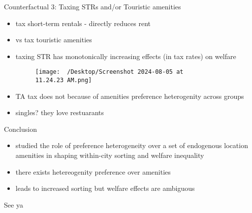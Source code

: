 \begin{frame}{Counterfactual 3: Taxing STRs and/or Touristic amenities}
	\begin{itemize}
		\item tax short-term rentals - directly reduces rent 
        \item vs tax touristic amenities
        \item taxing STR has monotonically increasing effects (in tax rates) on welfare 
        \begin{figure}
            \centering
            \texttt{[image: ~/Desktop/Screenshot 2024-08-05 at 11.24.23 AM.png]}
            \caption{}
            \label{fig:photo}
        \end{figure}
        \item TA tax does not because of amenities preference heterogenity across groups
        \item singles? they love restuarants
	\end{itemize}
\end{frame}

\begin{frame}{Conclusion}
	\begin{itemize}
		\item studied the role of preference heterogeneity over a set of endogenous location amenities in shaping within-city sorting and welfare inequality
        \item there exists hetereogenity preference over amenities 
        \item leads to increased sorting but welfare effects are ambiguous
	\end{itemize}
\end{frame}

\begin{frame}[plain]
\begin{center}{\LARGE See ya}\end{center}
\end{frame}



